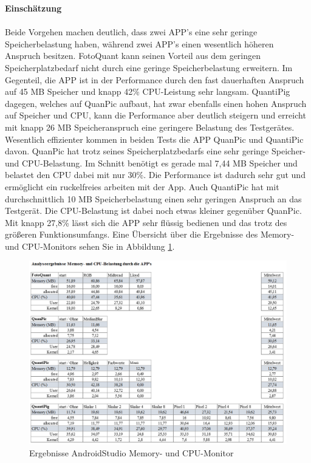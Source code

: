 \textbf{Einschätzung}
\\
\\
Beide Vorgehen machen deutlich, dass zwei APP’s eine sehr geringe Speicherbelastung haben, während zwei APP’s einen wesentlich höheren Anspruch besitzen. FotoQuant kann seinen Vorteil aus dem geringen Speicherplatzbedarf nicht durch eine geringe Speicherbelastung erweitern. Im Gegenteil, die APP ist in der Performance durch den fast dauerhaften Anspruch auf 45 MB Speicher und knapp 42\% CPU-Leistung sehr langsam. QuantiPig dagegen, welches auf QuanPic aufbaut, hat zwar ebenfalls einen hohen Anspruch auf Speicher und CPU, kann die Performance aber deutlich steigern und erreicht mit knapp 26 MB Speicheranspruch eine geringere Belastung des Testgerätes. 
Wesentlich effizienter kommen in beiden Tests die APP QuanPic und QuantiPic davon. QuanPic hat trotz seines Speicherplatzbedarfs eine sehr geringe Speicher- und CPU-Belastung. Im Schnitt benötigt es gerade mal 7,44 MB Speicher und belastet den CPU dabei mit nur 30\%. Die Performance ist dadurch sehr gut und ermöglicht ein ruckelfreies arbeiten mit der App. Auch QuantiPic hat mit durchschnittlich 10 MB Speicherbelastung einen sehr geringen Anspruch an das Testgerät. Die CPU-Belastung ist dabei noch etwas kleiner gegenüber QuanPic. Mit knapp 27,8\% lässt sich die APP sehr flüssig bedienen und das trotz des größeren Funktionsumfangs.
Eine Übersicht über die Ergebnisse des Memory- und CPU-Monitors sehen Sie in Abbildung \ref{fig:analyseergebnisse_maik}.

\begin{figure}
	\centering
		\includegraphics[width=1.0\textwidth]{img/analyseergebnisse_maik.png}
	\caption[ Ergebnisse AndroidStudio Memory- und CPU-Monitor]{ Ergebnisse AndroidStudio Memory- und CPU-Monitor}
	\label{fig:analyseergebnisse_maik}
\end{figure} 





